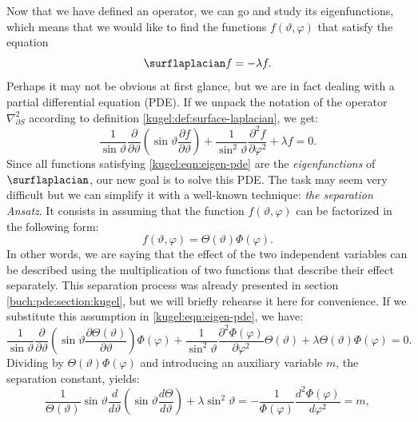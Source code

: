 Now that we have defined an operator, we can go and study its eigenfunctions,
which means that we would like to find the functions $f(\vartheta, \varphi)$
that satisfy the equation
\begin{equation} \label{kuvel:eqn:eigen}
    \surflaplacian f = -\lambda f.
\end{equation}
Perhaps it may not be obvious at first glance, but we are in fact dealing with a
partial differential equation (PDE). If we unpack the notation of the operator
$\nabla^2_{\partial S}$ according to definition
\ref{kugel:def:surface-laplacian}, we get:
\begin{equation} \label{kugel:eqn:eigen-pde}
    \frac{1}{\sin\vartheta} \frac{\partial}{\partial \vartheta} \left(
      \sin\vartheta \frac{\partial f}{\partial\vartheta}
    \right)
    + \frac{1}{\sin^2 \vartheta} \frac{\partial^2 f}{\partial\varphi^2}
    + \lambda f = 0.
\end{equation}
Since all functions satisfying \eqref{kugel:eqn:eigen-pde} are the
\emph{eigenfunctions} of $\surflaplacian$, our new goal is to solve this PDE.
The task may seem very difficult but we can simplify it with a well-known
technique: \emph{the separation Ansatz}. It consists in assuming that the
function $f(\vartheta, \varphi)$ can be factorized in the following form:
\begin{equation} \label{kugel:eqn:sep-ansatz:0}
    f(\vartheta, \varphi) = \Theta(\vartheta)\Phi(\varphi). 
\end{equation}
In other words, we are saying that the effect of the two independent variables
can be described using the multiplication of two functions that describe their
effect separately. This separation process was already presented in section
\ref{buch:pde:section:kugel}, but we will briefly rehearse it here for
convenience. If we substitute this assumption in
\eqref{kugel:eqn:eigen-pde}, we have:
\begin{equation} \label{kugel:eqn:sep-ansatz:1}
    \frac{1}{\sin\vartheta} \frac{\partial}{\partial \vartheta} \left(
      \sin\vartheta \frac{\partial  \Theta(\vartheta)}{\partial\vartheta}
    \right) \Phi(\varphi)
    + \frac{1}{\sin^2 \vartheta} \frac{\partial^2 \Phi(\varphi)}{\partial\varphi^2}
      \Theta(\vartheta)
    + \lambda \Theta(\vartheta)\Phi(\varphi) = 0.
\end{equation}
Dividing by $\Theta(\vartheta)\Phi(\varphi)$ and introducing an auxiliary
variable $m$, the separation constant, yields:
\begin{equation*}
  \frac{1}{\Theta(\vartheta)}\sin \vartheta \frac{d}{d \vartheta} \left(
    \sin \vartheta \frac{d \Theta}{d \vartheta}
  \right)
  + \lambda \sin^2 \vartheta
  = -\frac{1}{\Phi(\varphi)} \frac{d^2\Phi(\varphi)}{d\varphi^2}
  = m,
\end{equation*}
